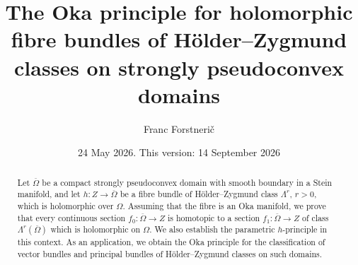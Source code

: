 \documentclass[11pt]{amsart}
\numberwithin{equation}{section}
\theoremstyle{definition}
\begin{document}
 

\title{The Oka principle for holomorphic fibre bundles of 
H\"older--Zygmund classes on strongly pseudoconvex domains}

\author{Franc Forstneri{\v c}}

\address{Franc Forstneri{\v c}, Faculty of Mathematics and Physics, University of Ljubljana, Jadranska 19, 1000 Ljubljana, Slovenia}

\address{Franc Forstneri{\v c}, Institute of Mathematics, Physics, and Mechanics, Jadranska 19, 1000 Ljubljana, Slovenia}




\date{24 May 2026. This version: 14 September 2026}


\begin{abstract} 
Let \(\overline \Omega\) be a compact strongly pseudoconvex domain
with smooth boundary in a Stein manifold, 
and let \(h:Z\to \overline \Omega\) be a 
fibre bundle of H\"older--Zygmund class \(\Lambda^r\), \(r>0\), 
which is holomorphic over \(\Omega\).
Assuming that the fibre is an Oka manifold, we prove that 
every continuous section \(f_0:\overline \Omega\to Z\) 
is homotopic to a section \(f_1:\overline \Omega\to Z\) 
of class \(\Lambda^r(\overline \Omega)\) which is holomorphic on \(\Omega\).
We also establish the parametric $h$-principle in this context.  
As an application, we obtain the Oka principle for the classification
of vector bundles and principal bundles of H\"older--Zygmund classes
on such domains. 
\end{abstract}

\maketitle
\end{document}
